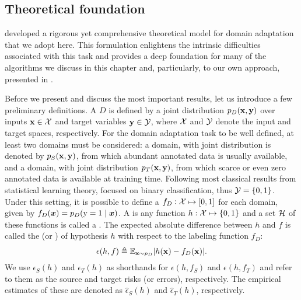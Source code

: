 \subsection{Theoretical foundation}
\label{sec:da_theory}
\citet{BenDavid2010} developed a rigorous yet comprehensive theoretical model for domain adaptation that we adopt here. This formulation enlightens the intrinsic difficulties associated with this task and provides a deep foundation for many of the algorithms we discuss in this chapter and, particularly, to our own approach, presented in .

Before we present and discuss the most important results, let us introduce a few preliminary definitions. A  $D$ is defined by a joint distribution $p_D({\mathbf{x}}, {\mathbf{y}})$ over inputs ${\mathbf{x}} \in {\mathcal{X}}$ and target variables ${\mathbf{y}} \in {\mathcal{Y}}$, where ${\mathcal{X}}$ and ${\mathcal{Y}}$ denote the input and target spaces, respectively. For the domain adaptation task to be well defined, at least two domains must be considered: a  domain, with joint distribution is denoted by $p_S({\mathbf{x}}, {\mathbf{y}})$, from which abundant annotated data is usually available, and a  domain, with joint distribution $p_T({\mathbf{x}}, {\mathbf{y}})$, from which scarce or even zero annotated data is available at training time. Following most classical results from statistical learning theory, \citet{BenDavid2010} focused on binary classification, thus ${\mathcal{Y}} = \{0, 1\}$. Under this setting, it is possible to define a  $f_D: {\mathcal{X}} \mapsto [0, 1]$ for each domain, given by $f_D({\bm{x}}) = p_D({\textnormal{y}}=1 \mid {\bm{x}})$. A  is any function $h: {\mathcal{X}} \mapsto \{0,1\}$ and a set ${\mathcal{H}}$ of these functions is called a . The expected absolute difference between $h$ and $f$ is called the  (or ) of hypothesis $h$ with respect to the labeling function $f_D$:
\begin{equation}
	\epsilon(h,f) \triangleq \mathbb{E}_{{\mathbf{x}} \sim p_D} |h({\mathbf{x}}) - f_D({\mathbf{x}})|.
\end{equation}
We use $\epsilon_S(h)$ and $\epsilon_T(h)$ as shorthands for $\epsilon(h,f_S)$ and $\epsilon(h,f_T)$ and refer to them as the source and target risks (or errors), respectively. The empirical estimates of these are denoted as $\widehat{\epsilon}_S(h)$ and $\widehat{\epsilon}_T(h)$, respectively.

